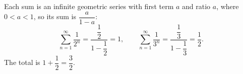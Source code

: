 Each sum is an infinite geometric series with first term $a$ and ratio $a$, where $0<a<1$, so its sum is $\dfrac{a}{1-a}$:
\[\sum_{n=1}^{\infty}\dfrac{1}{2^n}=\dfrac{\dfrac12}{1-\dfrac12}=1,\qquad \sum_{n=1}^{\infty}\dfrac{1}{3^n}=\dfrac{\dfrac13}{1-\dfrac13}=\dfrac12.\]
The total is $1+\dfrac12=\boxed{\dfrac32}$.
